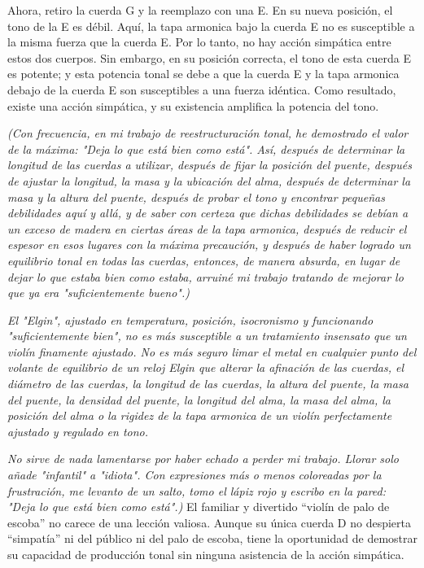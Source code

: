 \documentclass[12pt]{book}
\begin{document}
Ahora, retiro la cuerda G y la reemplazo con una E. En su nueva posición, el tono de la E es débil. Aquí, la tapa armonica bajo la cuerda E no es susceptible a la misma fuerza que la cuerda E. Por lo tanto, no hay acción simpática entre estos dos cuerpos. Sin embargo, en su posición correcta, el tono de esta cuerda E es potente; y esta potencia tonal se debe a que la cuerda E y la tapa armonica debajo de la cuerda E son susceptibles a una fuerza idéntica. Como resultado, existe una acción simpática, y su existencia amplifica la potencia del tono.

\textit{(Con frecuencia, en mi trabajo de reestructuración tonal, he demostrado el valor de la máxima: "Deja lo que está bien como está". Así, después de determinar la longitud de las cuerdas a utilizar, después de fijar la posición del puente, después de ajustar la longitud, la masa y la ubicación del alma, después de determinar la masa y la altura del puente, después de probar el tono y encontrar pequeñas debilidades aquí y allá, y de saber con certeza que dichas debilidades se debían a un exceso de madera en ciertas áreas de la tapa armonica, después de reducir el espesor en esos lugares con la máxima precaución, y después de haber logrado un equilibrio tonal en todas las cuerdas, entonces, de manera absurda, en lugar de dejar lo que estaba bien como estaba, arruiné mi trabajo tratando de mejorar lo que ya era "suficientemente bueno".)}

\textit{El "Elgin", ajustado en temperatura, posición, isocronismo y funcionando "suficientemente bien", no es más susceptible a un tratamiento insensato que un violín finamente ajustado. No es más seguro limar el metal en cualquier punto del volante de equilibrio de un reloj Elgin que alterar la afinación de las cuerdas, el diámetro de las cuerdas, la longitud de las cuerdas, la altura del puente, la masa del puente, la densidad del puente, la longitud del alma, la masa del alma, la posición del alma o la rigidez de la tapa armonica de un violín perfectamente ajustado y regulado en tono.}

\textit{No sirve de nada lamentarse por haber echado a perder mi trabajo. Llorar solo añade "infantil" a "idiota". Con expresiones más o menos coloreadas por la frustración, me levanto de un salto, tomo el lápiz rojo y escribo en la pared: "Deja lo que está bien como está".)}
El familiar y divertido ``violín de palo de escoba'' no carece de una lección valiosa. Aunque su única cuerda D no despierta ``simpatía'' ni del público ni del palo de escoba, tiene la oportunidad de demostrar su capacidad de producción tonal sin ninguna asistencia de la acción simpática.
\end{document}
